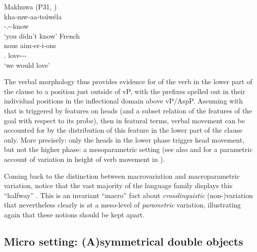 \documentclass[output=paper]{langsci/langscibook}
\begin{document}
\ea\label{ex:vdwal:3.12} Makhuwa (P31, \citealt[169]{vanderWal2009})\\
    \gll kha-mw-aa-tsúwéla\\
        \Neg{}-\Spl.\Sm{}-\Ipfv{}-know\\
    \glt ‘you didn't know’
\ex\label{ex:vdwal:3.13} French\\
    \gll  nous  aim-er-i-ons\\
          \Fsg{}.\Pron{}  love-\Irr{}-\Pst{}-\Fsg{}\\
    \glt  ‘we would love’
\z

The verbal morphology thus provides evidence for  of the
verb in the lower part of the clause to a position just outside of vP, with the
prefixes spelled out in their individual positions in the inflectional domain
above vP/AspP. Assuming with \citet{Roberts2010} that  is
triggered by features on heads (and a subset relation of the features of the
goal with respect to its probe), then in featural terms,  verbal
movement can be accounted for by the distribution of this
feature in the lower part of the clause only. More precisely: only the heads in
the lower phase trigger head movement, but not the higher phase: a
mesoparametric setting (see also \citealt{Ledgeway2013} and
\citealt{Schifano2015} for a parametric account of variation in height of verb
movement in ).

Coming back to the distinction between macrovariation and macroparametric
variation, notice that the vast majority of the language family displays this
“halfway” . This is an invariant “macro” fact about 
\emph{crosslinguistic} (non-)variation that nevertheless clearly is at a
meso-level of \emph{parametric} variation, illustrating again that these
notions should be kept apart.

\subsection{Micro setting: (A)symmetrical double objects}\label{sub:3.2.3}
\end{document}

